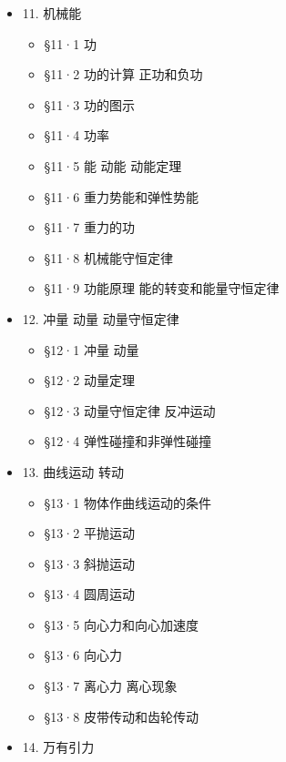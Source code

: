 \begin{itemize}
  \begin{itemize}
  \tightlist
  \item
    §10·1 机械的功的原理
  \item
    §10·2 机械效率和机械利益
  \item
    §10·3 杠杆类简单机械
  \item
    §10·4 杠杆类简单机械的组合
  \item
    §10·5 斜面类简单机械
  \end{itemize}
\item
  11. 机械能

  \begin{itemize}
  \tightlist
  \item
    §11·1 功
  \item
    §11·2 功的计算 正功和负功
  \item
    §11·3 功的图示
  \item
    §11·4 功率
  \item
    §11·5 能 动能 动能定理
  \item
    §11·6 重力势能和弹性势能
  \item
    §11·7 重力的功
  \item
    §11·8 机械能守恒定律
  \item
    §11·9 功能原理 能的转变和能量守恒定律
  \end{itemize}
\item
  12. 冲量 动量 动量守恒定律

  \begin{itemize}
  \tightlist
  \item
    §12·1 冲量 动量
  \item
    §12·2 动量定理
  \item
    §12·3 动量守恒定律 反冲运动
  \item
    §12·4 弹性碰撞和非弹性碰撞
  \end{itemize}
\item
  13. 曲线运动 转动

  \begin{itemize}
  \tightlist
  \item
    §13·1 物体作曲线运动的条件
  \item
    §13·2 平抛运动
  \item
    §13·3 斜抛运动
  \item
    §13·4 圆周运动
  \item
    §13·5 向心力和向心加速度
  \item
    §13·6 向心力
  \item
    §13·7 离心力 离心现象
  \item
    §13·8 皮带传动和齿轮传动
  \end{itemize}
\item
  14. 万有引力


\end{itemize}
